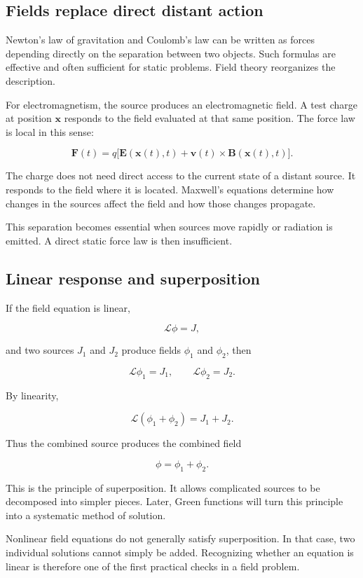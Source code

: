 \subsection{Fields replace direct distant action}

Newton's law of gravitation and Coulomb's law can be written as forces depending directly on the separation between two objects. Such formulas are effective and often sufficient for static problems. Field theory reorganizes the description.

For electromagnetism, the source produces an electromagnetic field. A test charge at position \(\mathbf{x}\) responds to the field evaluated at that same position. The force law is local in this sense:

\[
\mathbf{F}(t)
=
q\bigl[
\mathbf{E}(\mathbf{x}(t),t)
+
\mathbf{v}(t)\times\mathbf{B}(\mathbf{x}(t),t)
\bigr].
\]

The charge does not need direct access to the current state of a distant source. It responds to the field where it is located. Maxwell's equations determine how changes in the sources affect the field and how those changes propagate.

This separation becomes essential when sources move rapidly or radiation is emitted. A direct static force law is then insufficient.

\subsection{Linear response and superposition}

If the field equation is linear,

\[
\mathcal{L}\phi=J,
\]

and two sources \(J_{1}\) and \(J_{2}\) produce fields \(\phi_{1}\) and \(\phi_{2}\), then

\[
\mathcal{L}\phi_{1}=J_{1},
\qquad
\mathcal{L}\phi_{2}=J_{2}.
\]

By linearity,

\[
\mathcal{L}(\phi_{1}+\phi_{2})
=
J_{1}+J_{2}.
\]

Thus the combined source produces the combined field

\[
\phi=\phi_{1}+\phi_{2}.
\]

This is the principle of superposition. It allows complicated sources to be decomposed into simpler pieces. Later, Green functions will turn this principle into a systematic method of solution.

Nonlinear field equations do not generally satisfy superposition. In that case, two individual solutions cannot simply be added. Recognizing whether an equation is linear is therefore one of the first practical checks in a field problem.

